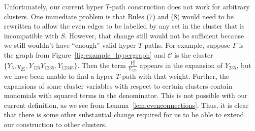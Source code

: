 \documentclass[pdftex]{sigma}
\numberwithin{equation}{section}
\begin{document}
Unfortunately, our current hyper $T$-path construction does not work for arbitrary clusters. One immediate problem is that Rules (7) and (8) would need to be rewritten to allow the even edges to be labelled by any set in the cluster that is incompatible with $S$. However, that change still would not be sufficient because we still wouldn't have ``enough'' valid hyper $T$-paths. For example, suppose $\Gamma$ is the graph from Figure~\ref{fig:example_hypergraph} and $\mathcal{C}$ is the cluster $\{Y_5,y_{25},Y_{125}Y_{1235},Y_{12345}\}$. Then the term $\frac{Y_5^2}{Y_{125}}$ appears in the expansion of $Y_{235}$, but we have been unable to find a hyper $T$-path with that weight. Further, the expansions of some cluster variables with respect to certain clusters contain monomials with squared terms in the denominator. This is not possible with our current definition, as we see from Lemma~\ref{lem:evenconnections}. Thus, it is clear that there is some other substantial change required for us to be able to extend our construction to other clusters.
\end{document}
